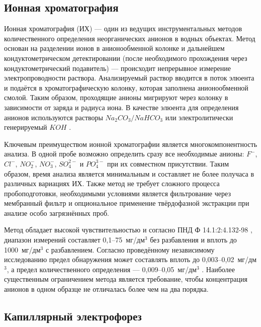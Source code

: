 \subsection{Ионная хроматография}

Ионная хроматография (ИХ) — один из ведущих инструментальных методов количественного определения неорганических анионов в водных объектах. Метод основан на разделении ионов в анионообменной колонке и дальнейшем кондуктометрическом детектировании (после необходимого прохождения через кондуктометрический подавитель) — происходит непрерывное измерение электропроводности раствора. Анализируемый раствор вводится в поток элюента и подаётся в хроматографическую колонку, которая заполнена анионообменной смолой. Таким образом, проходящие анионы мигрируют через колонку в зависимости от заряда и радиуса иона. В качестве элюента для определения анионов используются растворы $Na_2CO_3/NaHCO_3$ или электролитически генерируемый $KOH$ \cite{liApplicationsTwodimensionalIon2023}.

Ключевым преимуществом ионной хроматографии является многокомпонентность анализа. В одной пробе возможно определить сразу все необходимые анионы: $F^-$, $Cl^-$, $NO_2^-$, $NO_3^-$, $SO_4^{2-}$ и $PO_4^{3-}$ при их совместном присутствии. Таким образом, время анализа является минимальным и составляет не более получаса в различных вариациях ИХ. Также метод не требует сложного процесса пробоподготовки, необходимыми условиями является фильтрование через мембранный фильтр и опциональное применение твёрдофазной экстракции при анализе особо загрязнённых проб.

Метод обладает высокой чувствительностью и согласно ПНД Ф 14.1:2:4.132-98 \cite{pndf141244132}, диапазон измерений составляет 0,1--75~мг/дм$^3$ без разбавления и вплоть до 1000~мг/дм$^3$ с разбавлением. Согласно проведённому независимому исследованию предел обнаружения может составлять вплоть до 0,003--0,02~мг/дм$^3$, а предел количественного определения — 0,009--0,05~мг/дм$^3$ \cite{filiposkaSpasicValidationIon2025}. Наиболее существенным ограничением метода является требование, чтобы концентрация анионов в одном образце не отличалась более чем на два порядка.

\subsection{Капиллярный электрофорез}

